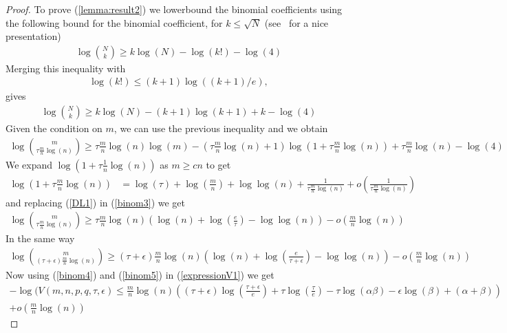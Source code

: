 \documentclass[english]{article}
\newcommand{\1}{\textbf{1}}
\begin{document}
\begin{proof}
To prove (\ref{lemma:result2}) we lowerbound the binomial coefficients using the following bound for the binomial coefficient, for $k\leq \sqrt{N}$ (see~\cite{blog:binomial} for a nice presentation) 
\begin{align}
\log \binom{N}{k} \geq k \log(N) -\log(k!) -\log(4)
\end{align}
Merging this inequality with
\begin{align}
\log(k!)\leq (k+1)\log((k+1)/e),
\end{align}
gives
\begin{align}
\log \binom{N}{k} \geq k \log(N) -(k+1)\log(k+1)+k -\log(4)
\end{align}
Given the condition on $m$, we can use the previous inequality and we obtain
\begin{align} \label{binom3}
\log \binom{m}{\tau \frac{m}{n} \log(n)} \geq \tau \frac{m}{n} \log(n) \log(m) - \left(\tau \frac{m}{n} \log(n) +1\right) \log \left( 1+ \tau \frac{m}{n} \log(n) \right) +\tau \frac{m}{n} \log(n) -\log(4)
\end{align}
We expand $\log(1+\tau \frac{1}{n} \log(n))$ as $m\geq c n$ to get
\begin{align} \label{DL1}
\log(1+\tau \frac{m}{n} \log(n)) &=\log(\tau) +\log \left( \frac{m}{n}\right) + \log \log(n) +\frac{1}{\tau \frac{m}{n} \log(n)}+ o\left( \frac{1}{\tau \frac{m}{n} \log(n)} \right)
\end{align}
and replacing (\ref{DL1}) in (\ref{binom3}) we get 
\begin{align} \label{binom4}
\log \binom{m}{\tau \frac{m}{n} \log(n)} \geq \tau \frac{m}{n} \log(n) \left( \log(n)+\log \left( \frac{e}{\tau}\right) -\log \log(n) \right) - o \left( \frac{m}{n} \log(n) \right) 
\end{align}
In the same way
\begin{align} \label{binom5}
\log \binom{m}{(\tau+\epsilon) \frac{m}{n} \log(n)} \geq (\tau + \epsilon) \frac{m}{n} \log(n) \left( \log(n)+\log \left( \frac{e}{\tau+\epsilon}\right) -\log \log(n) \right) - o \left( \frac{m}{n} \log(n) \right) 
\end{align}
Now using (\ref{binom4}) and (\ref{binom5}) in (\ref{expressionV1}) we get
\begin{align} \label{expressionV3}
-\log(V(m,n,p,q,\tau, \epsilon) \leq \frac{m}{n} \log(n) \left( (\tau +\epsilon) \log \left( \frac{\tau +\epsilon}{e}\right) +\tau \log \left( \frac{\tau}{e}\right) - \tau \log(\alpha \beta) -\epsilon \log(\beta) +(\alpha +\beta) \right)\\
 + o \left( \frac{m}{n}\log(n) \right) \nonumber
\end{align}


\end{proof}
\end{document}
